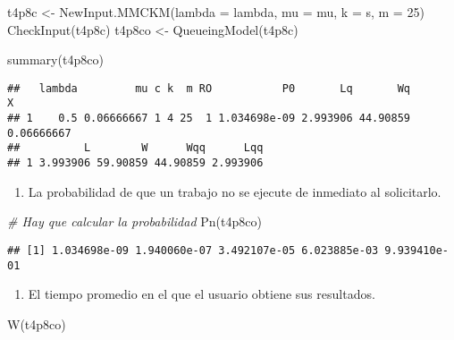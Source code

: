 \documentclass[
]{article}
\newenvironment{Shaded}{\begin{snugshade}}{\end{snugshade}}
\newcommand{\AttributeTok}[1]{\textcolor[rgb]{0.77,0.63,0.00}{#1}}
\newcommand{\CommentTok}[1]{\textcolor[rgb]{0.56,0.35,0.01}{\textit{#1}}}
\newcommand{\DecValTok}[1]{\textcolor[rgb]{0.00,0.00,0.81}{#1}}
\newcommand{\FunctionTok}[1]{\textcolor[rgb]{0.00,0.00,0.00}{#1}}
\newcommand{\NormalTok}[1]{#1}
\newcommand{\OtherTok}[1]{\textcolor[rgb]{0.56,0.35,0.01}{#1}}
\providecommand{\tightlist}{%
  \setlength{\itemsep}{0pt}\setlength{\parskip}{0pt}}
\begin{document}
\begin{Shaded}
\begin{Highlighting}[]
\NormalTok{t4p8c }\OtherTok{\textless{}{-}} \FunctionTok{NewInput.MMCKM}\NormalTok{(}\AttributeTok{lambda =}\NormalTok{ lambda, }\AttributeTok{mu =}\NormalTok{ mu, }\AttributeTok{k =}\NormalTok{ s, }\AttributeTok{m =} \DecValTok{25}\NormalTok{)}
\FunctionTok{CheckInput}\NormalTok{(t4p8c)}
\NormalTok{t4p8co }\OtherTok{\textless{}{-}} \FunctionTok{QueueingModel}\NormalTok{(t4p8c)}
\end{Highlighting}
\end{Shaded}

\begin{Shaded}
\begin{Highlighting}[]
\FunctionTok{summary}\NormalTok{(t4p8co)}
\end{Highlighting}
\end{Shaded}

\begin{verbatim}
##   lambda         mu c k  m RO           P0       Lq       Wq          X
## 1    0.5 0.06666667 1 4 25  1 1.034698e-09 2.993906 44.90859 0.06666667
##          L        W      Wqq      Lqq
## 1 3.993906 59.90859 44.90859 2.993906
\end{verbatim}

\begin{enumerate}
\def\labelenumi{\alph{enumi})}
\tightlist
\item
  La probabilidad de que un trabajo no se ejecute de inmediato al
  solicitarlo.
\end{enumerate}

\begin{Shaded}
\begin{Highlighting}[]
\CommentTok{\# Hay que calcular la probabilidad }
\FunctionTok{Pn}\NormalTok{(t4p8co)}
\end{Highlighting}
\end{Shaded}

\begin{verbatim}
## [1] 1.034698e-09 1.940060e-07 3.492107e-05 6.023885e-03 9.939410e-01
\end{verbatim}

\begin{enumerate}
\def\labelenumi{\alph{enumi})}
\setcounter{enumi}{1}
\tightlist
\item
  El tiempo promedio en el que el usuario obtiene sus resultados.
\end{enumerate}

\begin{Shaded}
\begin{Highlighting}[]
\FunctionTok{W}\NormalTok{(t4p8co)}
\end{Highlighting}
\end{Shaded}
\end{document}
